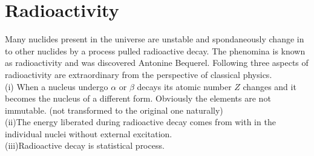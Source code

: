 














\newpage
\section{Radioactivity}
Many nuclides present in the universe are unstable and spondaneously change in to other nuclides by a process pulled radioactive decay. The phenomina is known as radioactivity and was discovered Antonine Bequerel. Following three aspects of radioactivity are extraordinary from the perspective of classical physics.\\
(i) \quad When a nucleus undergo $\alpha$ or $\beta$ decays its atomic number $Z$ changes and it becomes the nucleus of a different form. Obviously the elements are not immutable. (not transformed to the original one naturally)\\
(ii)\quad The energy liberated during radioactive decay comes from with in the individual nuclei without external excitation.\\
(iii)\quad Radioactive decay is statistical process.
